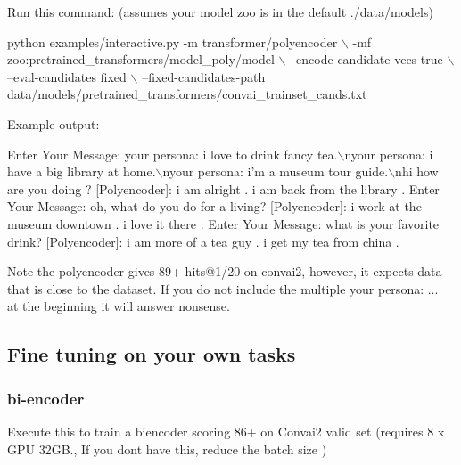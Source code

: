 Run this command\+: (assumes your model zoo is in the default ./data/models) 
\begin{DoxyCode}
python examples/interactive.py -m transformer/polyencoder \(\backslash\)
    -mf zoo:pretrained\_transformers/model\_poly/model \(\backslash\)
    --encode-candidate-vecs true \(\backslash\)
    --eval-candidates fixed  \(\backslash\)
    --fixed-candidates-path data/models/pretrained\_transformers/convai\_trainset\_cands.txt
\end{DoxyCode}


Example output\+: 
\begin{DoxyCode}
Enter Your Message: your persona: i love to drink fancy tea.\(\backslash\)nyour persona: i have a big library at
       home.\(\backslash\)nyour persona: i'm a museum tour guide.\(\backslash\)nhi how are you doing ?
[Polyencoder]: i am alright . i am back from the library .
Enter Your Message: oh, what do you do for a living?
[Polyencoder]: i work at the museum downtown . i love it there .
Enter Your Message: what is your favorite drink?
[Polyencoder]: i am more of a tea guy . i get my tea from china .
\end{DoxyCode}


Note the polyencoder gives 89+ hits@1/20 on convai2, however, it expects data that is close to the dataset. If you do not include the multiple \textquotesingle{}your persona\+: ...~\newline
\textquotesingle{} at the beginning it will answer nonsense.

\subsection*{Fine tuning on your own tasks}

\subsubsection*{bi-\/encoder}

Execute this to train a biencoder scoring 86+ on Convai2 valid set (requires 8 x G\+PU 32\+GB., If you don\textquotesingle{}t have this, reduce the batch size )


